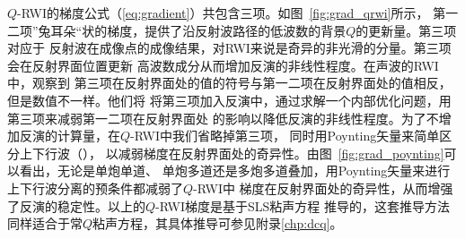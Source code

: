 $Q$-RWI的梯度公式（\ref{eq:gradient}）共包含三项。如图~\ref{fig:grad_qrwi}所示，
第一二项”兔耳朵“状的梯度，提供了沿反射波路径的低波数的背景$Q$的更新量。第三项对应于
反射波在成像点的成像结果，对RWI来说是奇异的非光滑的分量。第三项会在反射界面位置更新
高波数成分从而增加反演的非线性程度。在声波的RWI中，观察到
第三项在反射界面处的值的符号与第一二项在反射界面处的值相反，但是数值不一样。他们将
将第三项加入反演中，通过求解一个内部优化问题，用第三项来减弱第一二项在反射界面处
的影响以降低反演的非线性程度。为了不增加反演的计算量，在$Q$-RWI中我们省略掉第三项，
同时用Poynting矢量来简单区分上下行波（），
以减弱梯度在反射界面处的奇异性。由图~\ref{fig:grad_poynting}可以看出，无论是单炮单道、
单炮多道还是多炮多道叠加，用Poynting矢量来进行上下行波分离的预条件都减弱了$Q$-RWI中
梯度在反射界面处的奇异性，从而增强了反演的稳定性。以上的$Q$-RWI梯度是基于SLS粘声方程
推导的，这套推导方法同样适合于常$Q$粘声方程，其具体推导可参见附录\ref{chp:dcq}。

